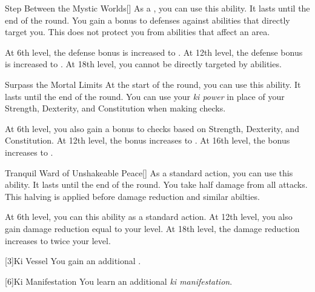 {            \begin{ability}{Step Between the Mystic Worlds}[]
                As a , you can use this ability.
                It lasts until the end of the round.
                You gain a  bonus to defenses against  abilities that directly target you.
                This does not protect you from abilities that affect an area.

                At 6th level, the defense bonus is increased to .
                At 12th level, the defense bonus is increased to .
                At 18th level, you cannot be directly targeted by  abilities.
            \end{ability}

            \begin{ability}{Surpass the Mortal Limits}
                At the start of the round, you can use this ability.
                It lasts until the end of the round.
                You can use your \textit{ki power} in place of your Strength, Dexterity, and Constitution when making checks.

                At 6th level, you also gain a  bonus to checks based on Strength, Dexterity, and Constitution.
                At 12th level, the bonus increases to .
                At 16th level, the bonus increases to .
            \end{ability}

            \begin{ability}{Tranquil Ward of Unshakeable Peace}[]
                As a standard action, you can use this ability.
                It lasts until the end of the round.
                You take half damage from all attacks.
                This halving is applied before damage reduction and similar abilties.

                At 6th level, you can  this ability as a standard action.
                At 12th level, you also gain damage reduction equal to your level.
                At 18th level, the damage reduction increases to twice your level.
            \end{ability}
        }

        [3]{Ki Vessel} You gain an additional .

        [6]{Ki Manifestation}
        You learn an additional \textit{ki manifestation}.

